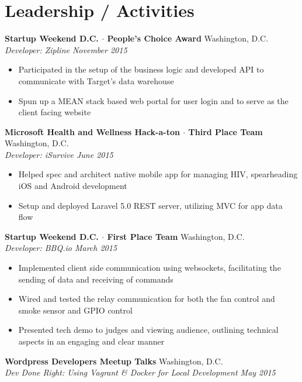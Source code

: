 \documentclass[10pt]{article}
\begin{document}
\section*{Leadership / Activities}
\textbf{Startup Weekend D.C. $\cdot$ People's Choice Award} \hfill Washington, D.C. \\
\textit{Developer: Zipline \hfill November 2015} \\
\vspace{-1em}
\begin{itemize}
  \item Participated in the setup of the business logic and developed API to communicate with Target's data warehouse
  \item Spun up a MEAN stack based web portal for user login and to serve as the client facing website
\end{itemize}
\textbf{Microsoft Health and Wellness Hack-a-ton $\cdot$ Third Place Team} \hfill Washington, D.C. \\
\textit{Developer: iSurvive \hfill June 2015} \\
\vspace{-1em}
\begin{itemize}
  \item Helped spec and architect native mobile app for managing HIV, spearheading iOS and Android development
  \item Setup and deployed Laravel 5.0 REST server, utilizing MVC for app data flow
\end{itemize}
\textbf{Startup Weekend D.C. $\cdot$ First Place Team} \hfill Washington, D.C. \\
\textit{Developer: BBQ.io \hfill March 2015} \\
\vspace{-1em}
\begin{itemize}
  \item Implemented client side communication using websockets, facilitating the sending of data and receiving of commands
  \item Wired and tested the relay communication for both the fan control and smoke sensor and GPIO control
  \item Presented tech demo to judges and viewing audience, outlining technical aspects in an engaging and clear manner
\end{itemize}
\textbf{Wordpress Developers Meetup Talks} \hfill Washington, D.C. \\
\textit{Dev Done Right: Using Vagrant \& Docker for Local Development \hfill May 2015} \\
\end{document}
